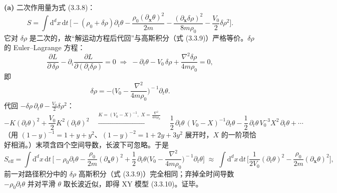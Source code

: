 \textbf{(a)} 二次作用量为式 (3.3.8)：
\begin{equation*}
S=\int\mathrm{d}^dx\,\mathrm{d}t\,
\Big[-(\rho_0+\delta\rho)\partial_t\theta-\frac{\rho_0(\partial_{\pmb{x}}\theta)^{2}}{2m}
-\frac{(\partial_{\pmb{x}}\delta\rho)^{2}}{8m\rho_0}-\frac{V_0}{2}\delta\rho^{2}\Big] .
\end{equation*}
它对 $\delta\rho$ 是二次的，故“解运动方程后代回”与高斯积分（式 (3.3.9)）严格等价。$\delta\rho$ 的 Euler--Lagrange 方程：
\begin{equation*}
\frac{\partial L}{\partial\,\delta\rho}
-\partial_i\frac{\partial L}{\partial(\partial_i\delta\rho)}=0
\;\Longrightarrow\;
-\partial_t\theta-V_0\,\delta\rho+\frac{\nabla^{2}\delta\rho}{4m\rho_0}=0 ,
\end{equation*}
即
\begin{equation*}
\delta\rho=-\Big(V_0-\frac{\nabla^{2}}{4m\rho_0}\Big)^{\!-1}\partial_t\theta .
\end{equation*}
代回 $-\delta\rho\,\partial_t\theta-\frac{V_0}{2}\delta\rho^{2}$：
\begin{equation*}
-K(\partial_t\theta)^{2}+\frac{V_0}{2}K^{2}(\partial_t\theta)^{2}
\quad\xrightarrow{K=(V_0-X)^{-1},\;X=\frac{\nabla^{2}}{4m\rho_0}}\quad
\frac12\,\partial_t\theta\,(V_0-X)^{-1}\partial_t\theta-\frac12\,\partial_t\theta\,V_0^{-3}X^{2}\,\partial_t\theta+\cdots
\end{equation*}
（用 $(1-y)^{-1}=1+y+y^{2}$、$(1-y)^{-2}=1+2y+3y^{2}$ 展开时，$X$ 的一阶项恰好相消。）末项含四个空间导数，长波下可忽略。于是
\begin{equation*}
S_{\mathrm{eff}}=\int\mathrm{d}^dx\,\mathrm{d}t\,
\Big[-\rho_0\partial_t\theta-\frac{\rho_0}{2m}(\partial_{\pmb{x}}\theta)^{2}
+\frac12\,\partial_t\theta\Big(V_0-\frac{\nabla^{2}}{4m\rho_0}\Big)^{\!-1}\partial_t\theta\Big]
\;\approx\;
\int\mathrm{d}^dx\,\mathrm{d}t\,
\Big[\frac{1}{2V_0}(\partial_t\theta)^{2}-\frac{\rho_0}{2m}(\partial_{\pmb{x}}\theta)^{2}\Big],
\end{equation*}
前一对路径积分中的 $\delta\rho$ 高斯积分（式 (3.3.9)）完全相同；弃掉全时间导数 $-\rho_0\partial_t\theta$ 并对平滑 $\theta$ 取长波近似，即得 XY 模型 (3.3.10)。证毕。

